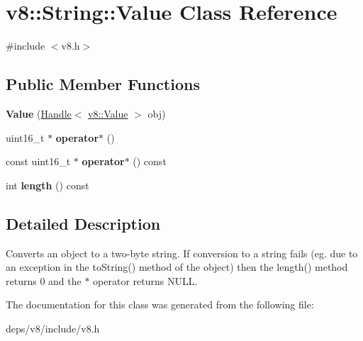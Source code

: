 \hypertarget{classv8_1_1_string_1_1_value}{}\section{v8\+:\+:String\+:\+:Value Class Reference}
\label{classv8_1_1_string_1_1_value}


{\ttfamily \#include $<$v8.\+h$>$}

\subsection*{Public Member Functions}
\begin{DoxyCompactItemize}
\item 
\hypertarget{classv8_1_1_string_1_1_value_a9d6a6d258196a0a34ac257b2abaf659a}{}{\bfseries Value} (\hyperlink{classv8_1_1_handle}{Handle}$<$ \hyperlink{classv8_1_1_value}{v8\+::\+Value} $>$ obj)\label{classv8_1_1_string_1_1_value_a9d6a6d258196a0a34ac257b2abaf659a}

\item 
\hypertarget{classv8_1_1_string_1_1_value_ae4f44b1977968de2e9f2ff703437fde3}{}uint16\+\_\+t $\ast$ {\bfseries operator$\ast$} ()\label{classv8_1_1_string_1_1_value_ae4f44b1977968de2e9f2ff703437fde3}

\item 
\hypertarget{classv8_1_1_string_1_1_value_a1cf21001f92284f290a6e550d567e757}{}const uint16\+\_\+t $\ast$ {\bfseries operator$\ast$} () const \label{classv8_1_1_string_1_1_value_a1cf21001f92284f290a6e550d567e757}

\item 
\hypertarget{classv8_1_1_string_1_1_value_a4b5014d7d4d0f60d39f37e421ae2eb91}{}int {\bfseries length} () const \label{classv8_1_1_string_1_1_value_a4b5014d7d4d0f60d39f37e421ae2eb91}

\end{DoxyCompactItemize}


\subsection{Detailed Description}
Converts an object to a two-\/byte string. If conversion to a string fails (eg. due to an exception in the to\+String() method of the object) then the length() method returns 0 and the $\ast$ operator returns N\+U\+L\+L. 

The documentation for this class was generated from the following file\+:\begin{DoxyCompactItemize}
\item 
deps/v8/include/v8.\+h\end{DoxyCompactItemize}
